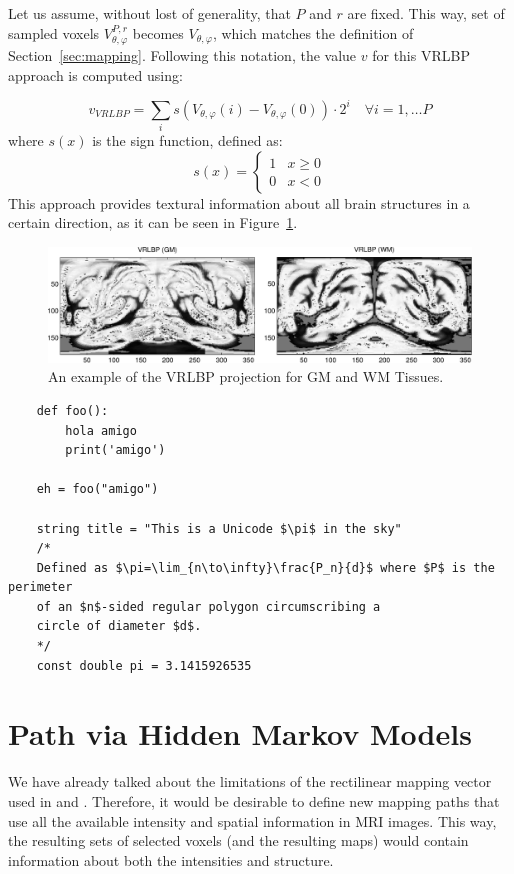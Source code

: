Let us assume, without lost of generality, that $P$ and $r$ are fixed. This way, set of sampled voxels $V_{\theta,\varphi}^{P,r}$ becomes $V_{\theta,\varphi}$, which matches the definition of Section~\ref{sec:mapping}. Following this notation, the value $v$ for this VRLBP approach is computed using: 

\begin{equation}
v_{VRLBP} = \sum_{i} s(V_{\theta,\varphi}(i)-V_{\theta,\varphi}(0))\cdot 2^{i} \quad \forall i=1,\dots P
\end{equation}
where $s(x)$ is the sign function, defined as: 
\begin{equation} %
s(x) = 
\begin{cases}
1      &  x \geq 0 \\
0      &  x < 0
\end{cases}
\end{equation}
This approach provides textural information about all brain structures in a certain direction, as it can be seen in Figure~\ref{fig:vrlbp}. 

\begin{figure}[htp]
	\centering
	\includegraphics[width=\textwidth]{Graphics/ch6/04-vrlbp}
	\caption{An example of the VRLBP projection for \ac{GM} and \ac{WM} Tissues. }
	\label{fig:vrlbp}
\end{figure}


\lstset{language=python} 
\begin{lstlisting}
	def foo():
		hola amigo
		print('amigo')
	
	eh = foo("amigo")
	
	string title = "This is a Unicode $\pi$ in the sky"
	/*
	Defined as $\pi=\lim_{n\to\infty}\frac{P_n}{d}$ where $P$ is the perimeter
	of an $n$-sided regular polygon circumscribing a
	circle of diameter $d$.
	*/
	const double pi = 3.1415926535
\end{lstlisting}

\section{Path via Hidden Markov Models}
We have already talked about the limitations of the rectilinear mapping vector used in \cite{Martinez-Murcia2015} and \cite{Martinez-MurciaVRLBP}. Therefore, it would be desirable to define new mapping paths that use all the available intensity and spatial information in MRI images. This way, the resulting sets of selected voxels (and the resulting maps) would contain information about both the intensities and structure.


